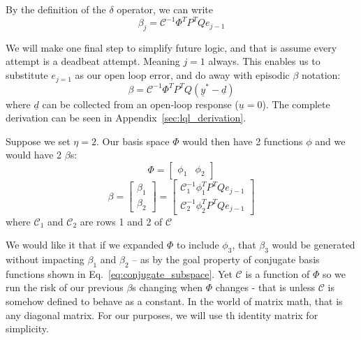 By the definition of the $\delta$ operator, we can write
\begin{equation}
    \beta_j = {\mathcal{C}}^{-1}\Phi^T P^T Q e_{j-1}
    \label{eq:beta_j_with_conjunct}
\end{equation}

We will make one final step to simplify future logic, and that is assume every attempt is a deadbeat attempt. Meaning $j=1$ always. This enables us to substitute $e_{j=1}$ as our open loop error, and do away with episodic $\beta$ notation:
\begin{equation}
    \beta = {\mathcal{C}}^{-1}\Phi^T P^T Q (\underline{y}^\ast - \underline{d})
    \label{eq:beta_j_with_conjunct_e_0}
\end{equation}
where $\underline{d}$ can be collected from an open-loop response ($\underline{u} = 0$). The complete derivation can be seen in Appendix~\ref{sec:lql_derivation}.


Suppose we set $\eta = 2$. Our basis space $\Phi$ would then have 2 functions $\phi$ and we would have 2 $\beta$s:
\begin{equation}
    \Phi = \begin{bmatrix}\phi_1 & \phi_2 \end{bmatrix}
\end{equation}
\begin{equation}
    \beta = 
    \begin{bmatrix}
        \beta_1 \\ \beta_2
    \end{bmatrix}
    =
    \begin{bmatrix}
        \mathcal{C}_1^{-1} \phi_1^T P^T Q e_{j-1} \\
        \mathcal{C}_2^{-1}\phi_2^T P^T Q e_{j-1}
    \end{bmatrix}
\end{equation}
where $\mathcal{C}_1$ and $\mathcal{C}_2$ are rows 1 and 2 of $\mathcal{C}$

We would like it that if we expanded $\Phi$ to include $\phi_3$, that $\beta_3$ would be generated without impacting $\beta_1$ and $\beta_2$ -- as by the goal property of conjugate basis functions shown in Eq.~\ref{eq:conjugate_subspace}. Yet $\mathcal{C}$ is a function of $\Phi$ so we run the risk of our previous $\beta$s changing when $\Phi$ changes - that is unless $\mathcal{C}$ is somehow defined to behave as a constant. In the world of matrix math, that is any diagonal matrix. For our purposes, we will use th identity matrix for simplicity.

